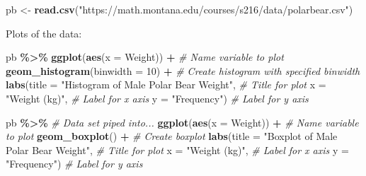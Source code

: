 \documentclass[
]{report}
\newenvironment{Shaded}{\begin{snugshade}}{\end{snugshade}}
\newcommand{\AttributeTok}[1]{\textcolor[rgb]{0.13,0.29,0.53}{#1}}
\newcommand{\CommentTok}[1]{\textcolor[rgb]{0.56,0.35,0.01}{\textit{#1}}}
\newcommand{\DecValTok}[1]{\textcolor[rgb]{0.00,0.00,0.81}{#1}}
\newcommand{\FunctionTok}[1]{\textcolor[rgb]{0.13,0.29,0.53}{\textbf{#1}}}
\newcommand{\NormalTok}[1]{#1}
\newcommand{\OtherTok}[1]{\textcolor[rgb]{0.56,0.35,0.01}{#1}}
\newcommand{\SpecialCharTok}[1]{\textcolor[rgb]{0.81,0.36,0.00}{\textbf{#1}}}
\newcommand{\StringTok}[1]{\textcolor[rgb]{0.31,0.60,0.02}{#1}}
\begin{document}
\begin{Shaded}
\begin{Highlighting}[]
\NormalTok{pb }\OtherTok{\textless{}{-}} \FunctionTok{read.csv}\NormalTok{(}\StringTok{"https://math.montana.edu/courses/s216/data/polarbear.csv"}\NormalTok{)}
\end{Highlighting}
\end{Shaded}

Plots of the data:

\begin{Shaded}
\begin{Highlighting}[]
\NormalTok{pb }\SpecialCharTok{\%\textgreater{}\%}
    \FunctionTok{ggplot}\NormalTok{(}\FunctionTok{aes}\NormalTok{(}\AttributeTok{x =}\NormalTok{ Weight)) }\SpecialCharTok{+}   \CommentTok{\# Name variable to plot}
    \FunctionTok{geom\_histogram}\NormalTok{(}\AttributeTok{binwidth =} \DecValTok{10}\NormalTok{) }\SpecialCharTok{+}  \CommentTok{\# Create histogram with specified binwidth}
    \FunctionTok{labs}\NormalTok{(}\AttributeTok{title =} \StringTok{"Histogram of Male Polar Bear Weight"}\NormalTok{, }\CommentTok{\# Title for plot}
       \AttributeTok{x =} \StringTok{"Weight (kg)"}\NormalTok{, }\CommentTok{\# Label for x axis}
       \AttributeTok{y =} \StringTok{"Frequency"}\NormalTok{) }\CommentTok{\# Label for y axis}

\NormalTok{pb }\SpecialCharTok{\%\textgreater{}\%} \CommentTok{\# Data set piped into...}
\FunctionTok{ggplot}\NormalTok{(}\FunctionTok{aes}\NormalTok{(}\AttributeTok{x =}\NormalTok{ Weight)) }\SpecialCharTok{+}   \CommentTok{\# Name variable to plot}
  \FunctionTok{geom\_boxplot}\NormalTok{() }\SpecialCharTok{+}  \CommentTok{\# Create boxplot}
  \FunctionTok{labs}\NormalTok{(}\AttributeTok{title =} \StringTok{"Boxplot of Male Polar Bear Weight"}\NormalTok{, }\CommentTok{\# Title for plot}
       \AttributeTok{x =} \StringTok{"Weight (kg)"}\NormalTok{, }\CommentTok{\# Label for x axis}
       \AttributeTok{y =} \StringTok{"Frequency"}\NormalTok{) }\CommentTok{\# Label for y axis}
\end{Highlighting}
\end{Shaded}
\end{document}
